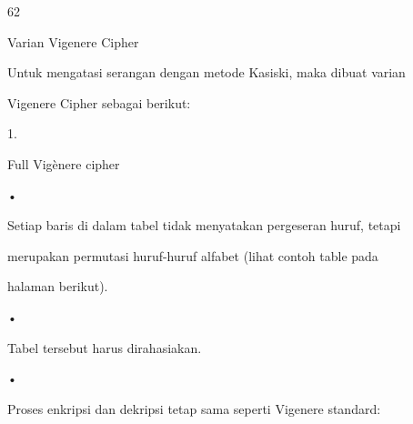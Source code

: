\documentclass{article}
\begin{document}

62

Varian Vigenere Cipher

Untuk mengatasi serangan dengan metode Kasiski, maka dibuat varian 

Vigenere Cipher sebagai berikut:

1.

Full Vigènere cipher

•

Setiap baris di dalam tabel tidak menyatakan pergeseran huruf, tetapi 

merupakan permutasi huruf-huruf alfabet (lihat contoh table pada 

halaman berikut). 

•

Tabel tersebut harus dirahasiakan.

•

Proses enkripsi dan dekripsi tetap sama seperti Vigenere standard:
\end{document}
